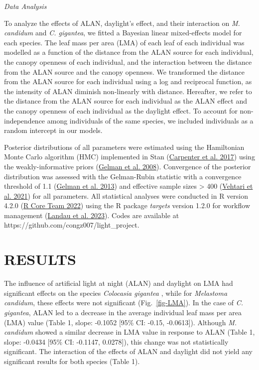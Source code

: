 \documentclass[
  12pt,
  letterpaper,
  DIV=11,
  numbers=noendperiod]{scrartcl}
\begin{document}
\emph{Data Analysis}

To analyze the effects of ALAN, daylight's effect, and their interaction
on \emph{M. candidum} and \emph{C. gigantea}, we fitted a Bayesian
linear mixed-effects model for each species. The leaf mass per area
(LMA) of each leaf of each individual was modelled as a function of the
distance from the ALAN source for each individual, the canopy openness
of each individual, and the interaction between the distance from the
ALAN source and the canopy openness. We transformed the distance from
the ALAN source for each individual using a log and reciprocal function,
as the intensity of ALAN diminish non-linearly with distance. Hereafter,
we refer to the distance from the ALAN source for each individual as the
ALAN effect and the canopy openness of each individual as the daylight
effect. To account for non-independence among individuals of the same
species, we included individuals as a random intercept in our models.

Posterior distributions of all parameters were estimated using the
Hamiltonian Monte Carlo algorithm (HMC) implemented in Stan
(\protect\hyperlink{ref-Carpenter2017}{Carpenter et al. 2017}) using the
weakly-informative priors (\protect\hyperlink{ref-Gelman2008}{Gelman et
al. 2008}). Convergence of the posterior distribution was assessed with
the Gelman-Rubin statistic with a convergence threshold of 1.1
(\protect\hyperlink{ref-Gelman2013}{Gelman et al. 2013}) and effective
sample sizes \textgreater{} 400
(\protect\hyperlink{ref-Vehtari2021}{Vehtari et al. 2021}) for all
parameters. All statistical analyses were conducted in R version 4.2.0
(\protect\hyperlink{ref-RCoreTeam2022}{R Core Team 2022}) using the R
package \emph{targets} version 1.2.0 for workflow management
(\protect\hyperlink{ref-Landau2023}{Landau et al. 2023}). Codes are
available at https://github.com/congz007/light\_project.

\hypertarget{results}{%
\section{RESULTS}\label{results}}

The influence of artificial light at night (ALAN) and daylight on LMA
had significant effects on the species \emph{Colocasia gigantea }, while
for \emph{Melastoma candidum}, these effects were not significant
(Fig.~\ref{fig-LMA}). In the case of \emph{C. gigantea}, ALAN led to a
decrease in the average individual leaf mass per area (LMA) value (Table
1, slope: -0.1052 {[}95\% CI: -0.15, -0.0613{]}). Although \emph{M.
candidum} showed a similar decrease in LMA value in response to ALAN
(Table 1, slope: -0.0434 {[}95\% CI: -0.1147, 0.0278{]}), this change
was not statistically significant. The interaction of the effects of
ALAN and daylight did not yield any significant results for both species
(Table 1).
\end{document}
